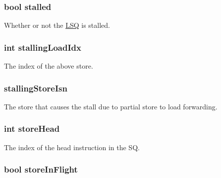 \hypertarget{classLSQUnit_a6f8bff553ad30865c7d0c62e05421eb8}{
\subsubsection[{stalled}]{\setlength{\rightskip}{0pt plus 5cm}bool {\bf stalled}}}
\label{classLSQUnit_a6f8bff553ad30865c7d0c62e05421eb8}
Whether or not the \hyperlink{classLSQ}{LSQ} is stalled. \hypertarget{classLSQUnit_af55bc9000c8b4e4cfcfbd018feca12a7}{
\subsubsection[{stallingLoadIdx}]{\setlength{\rightskip}{0pt plus 5cm}int {\bf stallingLoadIdx}}}
\label{classLSQUnit_af55bc9000c8b4e4cfcfbd018feca12a7}
The index of the above store. \hypertarget{classLSQUnit_afe1cdcfca6b44c28581d862228adc3da}{
\subsubsection[{stallingStoreIsn}]{ {\bf stallingStoreIsn}}}
\label{classLSQUnit_afe1cdcfca6b44c28581d862228adc3da}
The store that causes the stall due to partial store to load forwarding. \hypertarget{classLSQUnit_a6e87b6f77102183080ea6ab8599b26a9}{
\subsubsection[{storeHead}]{\setlength{\rightskip}{0pt plus 5cm}int {\bf storeHead}}}
\label{classLSQUnit_a6e87b6f77102183080ea6ab8599b26a9}
The index of the head instruction in the SQ. \hypertarget{classLSQUnit_aec79dbfe7cf50cf3d047cad7ee8fa157}{
\subsubsection[{storeInFlight}]{\setlength{\rightskip}{0pt plus 5cm}bool {\bf storeInFlight}}}
